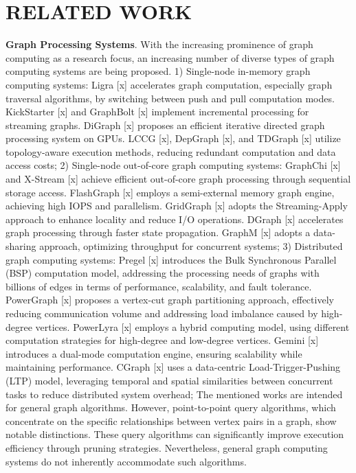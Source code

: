 \documentclass[lettersize,journal]{IEEEtran} %
\begin{document}
\section{RELATED WORK}
{\bf{Graph Processing Systems}}. With the increasing prominence of graph computing as a research focus, an increasing number of diverse types of graph computing systems are being proposed. 1) Single-node in-memory graph computing systems: Ligra [x] accelerates graph computation, especially graph traversal algorithms, by switching between push and pull computation modes. KickStarter [x] and GraphBolt [x] implement incremental processing for streaming graphs. DiGraph [x] proposes an efficient iterative directed graph processing system on GPUs. LCCG [x], DepGraph [x], and TDGraph [x] utilize topology-aware execution methods, reducing redundant computation and data access costs; 2) Single-node out-of-core graph computing systems: GraphChi [x] and X-Stream [x] achieve efficient out-of-core graph processing through sequential storage access. FlashGraph [x] employs a semi-external memory graph engine, achieving high IOPS and parallelism. GridGraph [x] adopts the Streaming-Apply approach to enhance locality and reduce I/O operations. DGraph [x] accelerates graph processing through faster state propagation. GraphM [x] adopts a data-sharing approach, optimizing throughput for concurrent systems; 3) Distributed graph computing systems: Pregel [x] introduces the Bulk Synchronous Parallel (BSP) computation model, addressing the processing needs of graphs with billions of edges in terms of performance, scalability, and fault tolerance. PowerGraph [x] proposes a vertex-cut graph partitioning approach, effectively reducing communication volume and addressing load imbalance caused by high-degree vertices. PowerLyra [x] employs a hybrid computing model, using different computation strategies for high-degree and low-degree vertices. Gemini [x] introduces a dual-mode computation engine, ensuring scalability while maintaining performance. CGraph [x] uses a data-centric Load-Trigger-Pushing (LTP) model, leveraging temporal and spatial similarities between concurrent tasks to reduce distributed system overhead; The mentioned works are intended for general graph algorithms. However, point-to-point query algorithms, which concentrate on the specific relationships between vertex pairs in a graph, show notable distinctions. These query algorithms can significantly improve execution efficiency through pruning strategies. Nevertheless, general graph computing systems do not inherently accommodate such algorithms.
\end{document}
